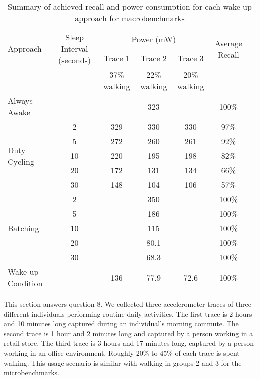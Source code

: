 \begin{table*}[t]
    \begin{tabular}{|l|c|c|c|c|c|c|}
    \hline
	\multirow{2}{*}{Approach}		& \multirow{2}{*}{\parbox{2.2cm}{Sleep Interval (seconds)}}
												& \multicolumn{3}{c|}{\parbox{1.2cm}{Power (mW)}}
																								& \multirow{2}{*}{\parbox{1.5cm}{Average Recall}} \\ \cline{3-5}
									&			& Trace 1		& Trace 2		& Trace 3 		& 							\\ 
									&			& 37\% walking	& 22\% walking		& 20\% walking		& \\ \hline
	Always Awake					& 			& \multicolumn{3}{c|}{323} 						& 100\% \\ \hline
	\multirow{5}{*}{Duty Cycling}	& 2			& 329			& 330			& 330			& 97\%	\\ \cline{2-6}
									& 5			& 272			& 260			& 261			& 92\%	\\ \cline{2-6}
									& 10		& 220			& 195			& 198			& 82\%	\\ \cline{2-6}
									& 20		& 172			& 131			& 134			& 66\%	\\ \cline{2-6}
									& 30		& 148			& 104			& 106			& 57\%	\\ \hline
	\multirow{5}{*}{Batching}		& 2			& \multicolumn{3}{c|}{350} 						& 100\% \\ \cline{2-6}
									& 5			& \multicolumn{3}{c|}{186} 						& 100\% \\ \cline{2-6}
	 								& 10		& \multicolumn{3}{c|}{115} 						& 100\% \\ \cline{2-6}
	 								& 20		& \multicolumn{3}{c|}{80.1} 					& 100\% \\ \cline{2-6}
	 								& 30		& \multicolumn{3}{c|}{68.3} 					& 100\% \\ \hline
	Wake-up Condition				&			& 136			& 77.9			& 72.6			& 100\% \\ \hline
    \end{tabular}
	\caption{Summary of achieved recall and power consumption for each wake-up approach for macrobenchmarks}
	\label{table:macrobenchmarks}
\end{table*}

This section answers question 8. We collected three accelerometer traces of three different individuals performing routine daily activities. The first trace is 2 hours and 10 minutes long captured during an individual's morning commute. The second trace is 1 hour and 2 minutes long and captured by a person working in a retail store. The third trace is 3 hours and 17 minutes long, captured by a person working in an office environment. Roughly 20\% to 45\% of each trace is spent walking. This usage scenario is similar with walking in groups 2 and 3 for the microbenchmarks. 

